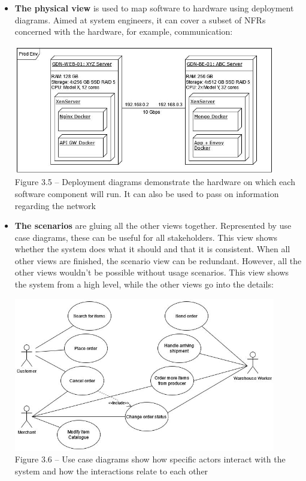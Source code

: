 \begin{itemize}
\item
\textbf{The physical view} is used to map software to hardware using deployment diagrams. Aimed at system engineers, it can cover a subset of NFRs concerned with the hardware, for example, communication:

\begin{center}
\includegraphics[width=0.9\textwidth]{content/1/chapter3/images/5.jpg}\\
Figure 3.5 – Deployment diagrams demonstrate the hardware on which each software component will run. It can also be used to pass on information regarding the network
\end{center}

\item
\textbf{The scenarios} are gluing all the other views together. Represented by use case diagrams, these can be useful for all stakeholders. This view shows whether the system does what it should and that it is consistent. When all other views are finished, the scenario view can be redundant. However, all the other views wouldn't be possible without usage scenarios. This view shows the system from a high level, while the other views go into the details:

\begin{center}
\includegraphics[width=0.9\textwidth]{content/1/chapter3/images/6.jpg}\\
Figure 3.6 – Use case diagrams show how specific actors interact with the system and how the interactions relate to each other
\end{center}

\end{itemize}

